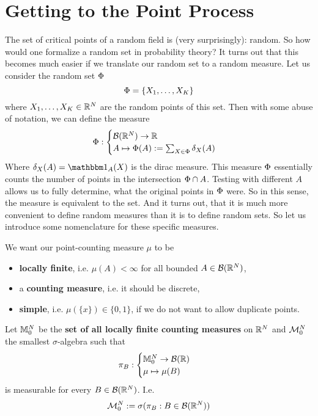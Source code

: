 \section{Getting to the Point Process}

The set of critical points of a random field is (very surprisingly): random.
So how would one formalize a random set in probability theory? It turns
out that this becomes much easier if we translate our random set to a random
measure. Let us consider the random set \(\Phi\)
\[
	\Phi = \{ X_1, \dots, X_K\}
\]
where \(X_1,\dots, X_K\in\mathbb{R}^N\) are the random points of this set. Then with some
abuse of notation, we can define the measure
\[
	\Phi :
	\begin{cases}
		\mathcal{B}(\mathbb{R}^N) \to \mathbb{R} \\
		A \mapsto \Phi(A):= \sum_{X\in \Phi}\delta_X(A) 
	\end{cases}
\]
Where \(\delta_X(A)=\ind_A(X)\) is the dirac measure. This measure \(\Phi\)
essentially counts the number of points in the intersection \(\Phi\cap A\).
Testing with different \(A\) allows us to fully determine, what
the original points in \(\Phi\) were. So in this sense, the measure is
equivalent to the set. And it turns out, that it is much more convenient
to define random measures than it is to define random sets.
So let us introduce some nomenclature for these specific measures.

We want our point-counting measure \(\mu\) to be
\begin{itemize}
	\item \textbf{locally finite}, i.e. \(\mu(A) < \infty\) for all bounded
	\(A\in\mathcal{B}(\mathbb{R}^N)\),
	\item a \textbf{counting measure}, i.e. it should be discrete,
	\item \textbf{simple}, i.e. \(\mu(\{x\})\in\{0,1\}\), if we do not want
	to allow duplicate points.
\end{itemize}
Let \(\mathbb{M}^{N}_0\) be the \textbf{set of all locally finite counting measures}
on \(\mathbb{R}^N\) and \(\mathcal{M}^{N}_0\) the smallest \(\sigma\)-algebra
such that
\[
	\pi_B : \begin{cases}
		\mathbb{M}^{N}_0 \to \mathcal{B}(\mathbb{R})\\
		\mu \mapsto \mu(B)
	\end{cases}
\]
is measurable for every \(B\in\mathcal{B}(\mathbb{R}^N)\). I.e.
\[
	\mathcal{M}^{N}_0 := \sigma(\pi_B : B\in\mathcal{B}(\mathbb{R}^N))
\]

